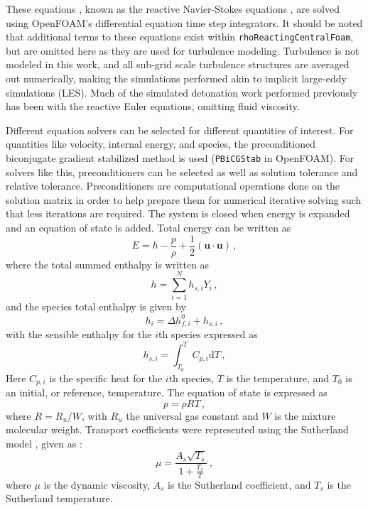 These equations \cite{kuo}, known as the reactive Navier-Stokes equations \cite{stokes}, are solved using OpenFOAM's differential equation time step integrators. It should be noted that additional terms to these equations exist within \verb|rhoReactingCentralFoam|, but are omitted here as they are used for turbulence modeling. Turbulence is not modeled in this work, and all sub-grid scale turbulence structures are averaged out numerically, making the simulations performed akin to implicit large-eddy simulations (LES). Much of the simulated detonation work performed previously has been with the reactive Euler equations, omitting fluid viscosity. 

Different equation solvers can be selected for different quantities of interest. For quantities like velocity, internal energy, and species, the preconditioned biconjugate gradient stabilized method \cite{vorst} is used (\verb|PBiCGStab| in OpenFOAM). For solvers like this, preconditioners can be selected as well as solution tolerance and relative tolerance. Preconditioners are computational operations done on the solution matrix in order to help prepare them for numerical iterative solving such that less iterations are required. The system is closed when energy is expanded and an equation of state is added. Total energy \cite{kuo} can be written as 
\begin{equation}
E = h - \frac{p}{\rho} +\frac{1}{2} \left(\bm{u}\cdot\bm{u}\right)\,,
\end{equation}
where the total summed enthalpy is written \cite{kuo} as 
\begin{equation}
h = \sum_{i = 1}^Nh_{s,i}Y_i\,,
\end{equation}
and the species total enthalpy \cite{kuo} is given by 
\begin{equation}
h_{i} = \Delta h_{f,i}^0 + h_{s,i}\,,
\end{equation}
with the sensible enthalpy for the $i$th species expressed as
\begin{equation}
h_{s,i} = \int_{T_0}^T C_{p,i}\mathrm{d}T\,,
\end{equation}
Here $C_{p,i}$ is the specific heat for the $i$th species, $T$ is the temperature, and $T_0$ is an initial, or reference, temperature. The equation of state is expressed as 
\begin{equation}
p = \rho R T\,,
\end{equation}
where $R=R_u/W$, with $R_u$ the universal gas constant and $W$ is the mixture molecular weight. Transport coefficients were represented using the Sutherland model \cite{sutherland}, given as \cite{ofug}:
\begin{equation}
\mu = \frac{A_s \sqrt{T_s}}{1 + \frac{T_s}{T}} \,,
\end{equation}
where $\mu$ is the dynamic viscosity, $A_s$ is the Sutherland coefficient, and $T_s$ is the Sutherland temperature. 


